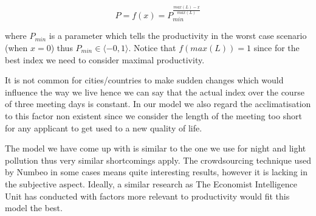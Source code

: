 $$P = f(x) = P_{min}^{\frac{max(L)-x}{max(L)}}$$

\noindent where $P_{min}$ is a parameter which tells the productivity in the worst case scenario  (when $x=0$) thus $ P_{min}\in \langle -0,1\rangle$. Notice that $f(max(L))=1$ since for the best index we need to consider maximal productivity.

It is not common for cities/countries to make sudden changes which would influence the way we live hence we can say that the actual index over the course of three meeting days is constant. In our model we also regard the acclimatisation to this factor non existent since we consider the length of the meeting too short for any applicant to get used to a new quality of life.


The model we have come up with is similar to the one we use for night and light pollution thus very similar shortcomings apply. The crowdsourcing technique used by Numbeo in some cases means quite interesting results, however it is lacking in the subjective aspect. Ideally, a similar research as The Economist Intelligence Unit has conducted with factors more relevant to productivity would fit this model the best. 